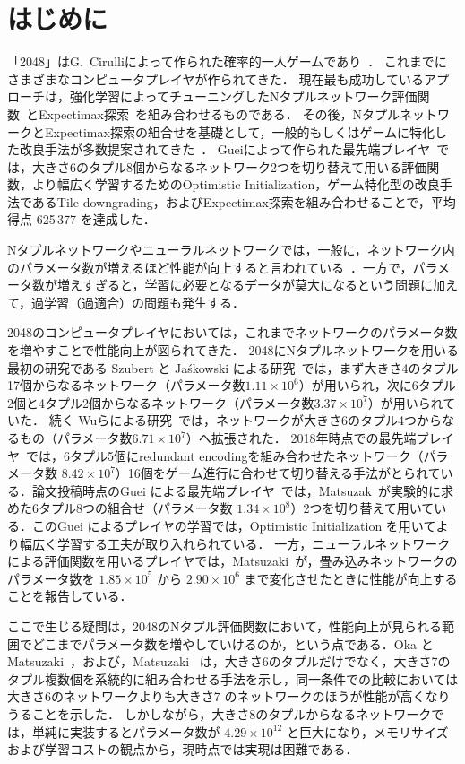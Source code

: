 \section{はじめに}
「2048」はG.~Cirulliによって作られた確率的一人ゲームであり~\cite{2048}．
これまでにさまざまなコンピュータプレイヤが作られてきた．
現在最も成功しているアプローチは，強化学習によってチューニングしたNタプルネットワーク評価関数~\cite{SzJa14}とExpectimax探索~\cite{YWHC16}を組み合わせるものである．
その後，NタプルネットワークとExpectimax探索の組合せを基礎として，一般的もしくはゲームに特化した改良手法が多数提案されてきた~\cite{YWHC16,Mats17,Jask17,GuCW22}．
Gueiによって作られた最先端プレイヤ~\cite{GuCW22}では，大きさ6のタプル8個からなるネットワーク2つを切り替えて用いる評価関数，より幅広く学習するためのOptimistic Initialization，ゲーム特化型の改良手法であるTile downgrading，およびExpectimax探索を組み合わせることで，平均得点 625\,377 を達成した．

Nタプルネットワークやニューラルネットワークでは，一般に，ネットワーク内のパラメータ数が増えるほど性能が向上すると言われている~\cite{kaplan2020scaling}．一方で，パラメータ数が増えすぎると，学習に必要となるデータが莫大になるという問題に加えて，過学習（過適合）の問題も発生する．

2048のコンピュータプレイヤにおいては，これまでネットワークのパラメータ数を増やすことで性能向上が図られてきた．
2048にNタプルネットワークを用いる最初の研究である Szubert と Ja\'{s}kowski による研究~\cite{SzJa14}では，まず大きさ4のタプル17個からなるネットワーク（パラメータ数$1.11\times 10^6$）が用いられ，次に6タプル2個と4タプル2個からなるネットワーク（パラメータ数$3.37\times 10^7$）が用いられていた．
続く Wuらによる研究~\cite{WYLC14}では，ネットワークが大きさ6のタプル4つからなるもの（パラメータ数$6.71\times 10^7$）へ拡張された．
2018年時点での最先端プレイヤ~\cite{Jask17}では，6タプル5個にredundant encodingを組み合わせたネットワーク（パラメータ数 $8.42\times 10^7$）16個をゲーム進行に合わせて切り替える手法がとられている．論文投稿時点のGuei による最先端プレイヤ~\cite{GuCW22}では，Matsuzak~\cite{Mats16}が実験的に求めた6タプル8つの組合せ（パラメータ数 $1.34\times 10^8$）2つを切り替えて用いている．このGuei によるプレイヤの学習では，Optimistic Initialization を用いてより幅広く学習する工夫が取り入れられている．
一方，ニューラルネットワークによる評価関数を用いるプレイヤでは，Matsuzaki~\cite{Mats19}が，畳み込みネットワークのパラメータ数を $1.85\times 10^5$ から $2.90\times 10^6$ まで変化させたときに性能が向上することを報告している．

ここで生じる疑問は，2048のNタプル評価関数において，性能向上が見られる範囲でどこまでパラメータ数を増やしていけるのか，という点である．Oka と Matsuzaki~\cite{OkMa16b}，および，Matsuzaki~\cite{Mats16} は，大きさ6のタプルだけでなく，大きさ7のタプル複数個を系統的に組み合わせる手法を示し，同一条件での比較においては大きさ6のネットワークよりも大きさ7 のネットワークのほうが性能が高くなりうることを示した．
しかしながら，大きさ8のタプルからなるネットワークでは，単純に実装するとパラメータ数が $4.29\times 10^{12}$ と巨大になり，メモリサイズおよび学習コストの観点から，現時点では実現は困難である．


